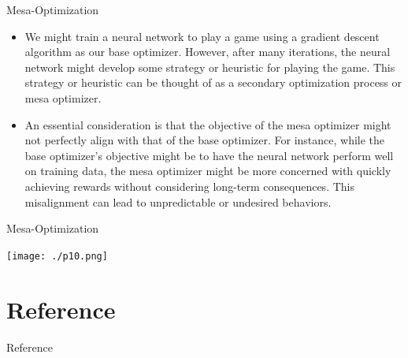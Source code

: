 \documentclass[aspectratio=1610,xcolor={dvipsnames},hyperref={colorlinks,unicode,linkcolor=violet,anchorcolor=BlueViolet,citecolor=YellowOrange,filecolor=black,urlcolor=Aquamarine}]{beamer}
\begin{document}
\begin{frame}[label={sec:orgee1f4ed}]{Mesa-Optimization}
\begin{itemize}
\item We might train a neural network to play a game using a gradient descent algorithm as our base optimizer. However, after many iterations, the neural network might develop some strategy or heuristic for playing the game. This strategy or heuristic can be thought of as a secondary optimization process or mesa optimizer.

\item An essential consideration is that the objective of the mesa optimizer might not perfectly align with that of the base optimizer. For instance, while the base optimizer's objective might be to have the neural network perform well on training data, the mesa optimizer might be more concerned with quickly achieving rewards without considering long-term consequences. This misalignment can lead to unpredictable or undesired behaviors.
\end{itemize}
\end{frame}
\begin{frame}[label={sec:org793bf7e}]{Mesa-Optimization}
\begin{center}
\texttt{[image: ./p10.png]}
\end{center}
\end{frame}
\section{Reference}
\label{sec:org076597c}

\begin{frame}[allowframebreaks]{Reference}
\printbibliography
\end{frame}
\end{document}
